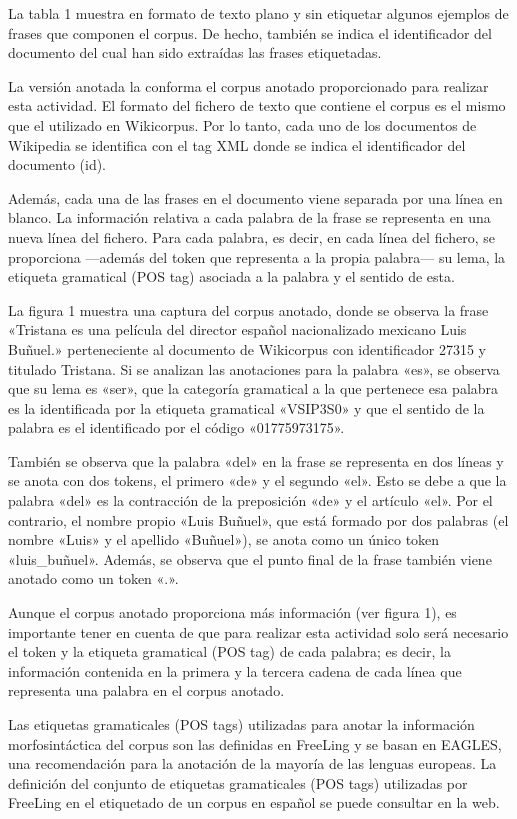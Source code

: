 \documentclass[12pt,a4paper,table]{article}
\begin{document}
La tabla 1 muestra en formato de texto plano y sin etiquetar algunos
ejemplos de frases que componen el corpus. De hecho, también se indica
el identificador del documento del cual han sido extraídas las frases
etiquetadas.

La versión anotada la conforma el corpus anotado proporcionado para
realizar esta actividad. El formato del fichero de texto que contiene el
corpus es el mismo que el utilizado en Wikicorpus. Por lo tanto, cada
uno de los documentos de Wikipedia se identifica con el tag XML donde se
indica el identificador del documento (id).

Además, cada una de las frases en el documento viene separada por una
línea en blanco. La información relativa a cada palabra de la frase se
representa en una nueva línea del fichero. Para cada palabra, es decir,
en cada línea del fichero, se proporciona ---además del token que
representa a la propia palabra--- su lema, la etiqueta gramatical (POS
tag) asociada a la palabra y el sentido de esta.

La figura 1 muestra una captura del corpus anotado, donde se observa la
frase «Tristana es una película del director español nacionalizado
mexicano Luis Buñuel.» perteneciente al documento de Wikicorpus con
identificador 27315 y titulado Tristana.
\newpage
Si se analizan las anotaciones para la palabra «es», se observa que su
lema es «ser», que la categoría gramatical a la que pertenece esa
palabra es la identificada por la etiqueta gramatical «VSIP3S0» y que el
sentido de la palabra es el identificado por el código «01775973175».

También se observa que la palabra «del» en la frase se representa en dos
líneas y se anota con dos tokens, el primero «de» y el segundo «el».
Esto se debe a que la palabra «del» es la contracción de la preposición
«de» y el artículo «el». Por el contrario, el nombre propio «Luis
Buñuel», que está formado por dos palabras (el nombre «Luis» y el
apellido «Buñuel»), se anota como un único token «luis\_buñuel». Además,
se observa que el punto final de la frase también viene anotado como un
token «.».

Aunque el corpus anotado proporciona más información (ver figura 1), es
importante tener en cuenta de que para realizar esta actividad solo será
necesario el token y la etiqueta gramatical (POS tag) de cada palabra;
es decir, la información contenida en la primera y la tercera cadena de
cada línea que representa una palabra en el corpus anotado.

Las etiquetas gramaticales (POS tags) utilizadas para anotar la
información morfosintáctica del corpus son las definidas en FreeLing y
se basan en EAGLES, una recomendación para la anotación de la mayoría de
las lenguas europeas. La definición del conjunto de etiquetas
gramaticales (POS tags) utilizadas por FreeLing en el etiquetado de un
corpus en español se puede consultar en la web.
\end{document}
